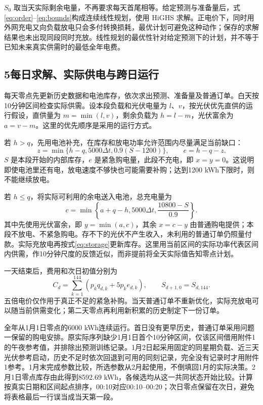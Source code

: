 \documentclass[11pt,a4paper]{article}
\begin{document}
$S_0$ 取当天实际剩余电量，不再要求每天首尾相等。给定预测与准备量后，式\eqref{eq:order}--\eqref{eq:bounds}构成连续线性规划，使用 HiGHS 求解。正电价下，同时用外网充电又向负载放电只会多付转换损耗，最优计划可避免这种动作；保存的求解结果也未出现同段同时充放。线性规划的最优性针对给定预测下的计划，并不等于已知未来真实供需时的最低全年电费。

\subsection*{5\quad 每日求解、实际供电与跨日运行}

每天零点先更新历史数据和电池库存，依次求出预测、准备量及普通订单。白天按10分钟区间检查实际供需。设本段负载和光伏电量为 $l$、$v$，按光伏优先直供的运行假设，直供量为 $m=\min(l,v)$，剩余负载为 $h=l-m$，光伏富余为 $a=v-m$。这里的优先顺序是采用的运行方式。

若 $h>q$，先用电池补充，在库存和放电功率允许范围内尽量满足当前缺口：
\begin{equation}
z=\min\{h-q,5000\Delta t,0.9(S-1200)\},\qquad e=h-q-z.
\label{eq:emergency}
\end{equation}
$S$ 是本段开始的内部库存，$e$ 是紧急购电量，此段不充电，即 $x=y=0$。这说明即使电池里还有电，放电速度不够快也可能需要补购；达到1200 kWh下限时，则不能继续放电。

若 $h\le q$，将实际可利用的余电送入电池，总充电量为
\begin{equation}
c=\min\left\{a+q-h,5000\Delta t,\frac{10800-S}{0.9}\right\}.
\end{equation}
其中先使用光伏富余，即 $y=\min(a,c)$，其余 $x=c-y$ 由普通购电提供；本段不放电、不紧急购电。存不下的光伏不产生收入，未利用的普通订单仍照量付款。实际充放电再按式\eqref{eq:storage}更新库存。这里用当前区间的实际功率代表区间内供需，作10分钟尺度的反馈近似，而非提前将全天实际值告知零点计划。

一天结束后，费用和次日初值分别为
\begin{equation}
C_d=\sum_{k=1}^{144}\left(p_kq_{d,k}+5p_ke_{d,k}\right),\qquad
S_{d+1,0}=S_{d,144}.
\label{eq:bill}
\end{equation}
五倍电价仅作用于真正不足的紧急补购。当天普通订单不重新优化，实际充放电可以随当前供需变化；第二天零点再利用新积累的历史制定下一份订单。

全年从1月1日零点的6000 kWh连续运行。首日没有更早历史，普通订单采用问题一保留的购电安排。原实际序列缺少1月1日首个10分钟区间，仅该区间借用附件1的午夜参考值，并排除出预测训练记录。1月2日起采用固定的同星期负载、近三天光伏参考启动，历史不足时依次回退到可用的同刻记录，完全没有记录时才用附件1参考。1月末完成参数比较，所选参数从2月起使用，不倒填回1月的实际决策。2月1日零点库存由此得到8592.69 kWh，各候选均从这一共同状态开始比较。计算按真实日期和区间起点排序，00:10对应00:10--00:20；次日零点保留在次日，避免将表格最后一行误当成当天第一段。
\end{document}
